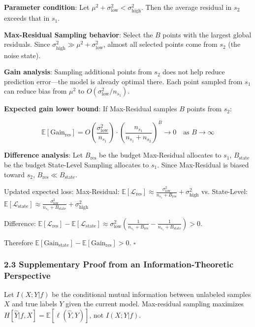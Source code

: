 \documentclass[
  12pt,
]{article}
\begin{document}
\textbf{Parameter condition}: Let
\(\mu^2 + \sigma^2_{\text{low}} < \sigma^2_{\text{high}}\). Then the average residual in \(s_2\)
exceeds that in \(s_1\).

\textbf{Max-Residual Sampling behavior}: Select the \(B\) points with the largest global residuals. Since
\(\sigma^2_{\text{high}} \gg \mu^2 + \sigma^2_{\text{low}}\), almost all selected points come from
\(s_2\) (the noise state).

\textbf{Gain analysis}: Sampling additional points from \(s_2\)
does not help reduce prediction error---the model is already optimal there. Each point sampled from \(s_1\)
can reduce bias from \(\mu^2\) to
\(O(\sigma^2_{\text{low}} / n_{s_1})\).

\textbf{Expected gain lower bound}: If Max-Residual samples \(B\) points from \(s_2\):

\[\mathbb{E}[\text{Gain}_{\text{res}}] = O\left(\frac{\sigma^2_{\text{low}}}{n_{s_1}}\right) \cdot \left(\frac{n_{s_1}}{n_{s_1} + n_{s_2}}\right)^B \to 0 \quad \text{as } B \to \infty\]

\textbf{Difference analysis}: Let \(B_{\text{res}}\) be the budget Max-Residual allocates to \(s_1\),
\(B_{\text{state}}\) be the budget State-Level Sampling allocates to \(s_1\). Since Max-Residual is biased toward
\(s_2\), \(B_{\text{res}} \ll B_{\text{state}}\).

Updated expected loss: Max-Residual:
\(\mathbb{E}[\mathcal{L}_{\text{res}}] \approx \frac{\sigma^2_{\text{low}}}{n_{s_1} + B_{\text{res}}} + \sigma^2_{\text{high}}\)
vs. State-Level:
\(\mathbb{E}[\mathcal{L}_{\text{state}}] \approx \frac{\sigma^2_{\text{low}}}{n_{s_1} + B_{\text{state}}} + \sigma^2_{\text{high}}\)

Difference: \(\mathbb{E}[\mathcal{L}_{\text{res}}] - \mathbb{E}[\mathcal{L}_{\text{state}}] \approx \sigma^2_{\text{low}}\left(\frac{1}{n_{s_1} + B_{\text{res}}} - \frac{1}{n_{s_1} + B_{\text{state}}}\right) > 0\).

Therefore
\(\mathbb{E}[\text{Gain}_{\text{state}}] - \mathbb{E}[\text{Gain}_{\text{res}}] > 0\). \(\square\)

\subsubsection{2.3
Supplementary Proof from an Information-Theoretic Perspective}\label{supplementary-proof-information-theoretic}

Let \(I(X; Y | f)\) be the conditional mutual information between unlabeled samples \(X\) and true labels \(Y\)
given the current model. Max-residual sampling maximizes
\(H[\hat{Y} | f, X] = \mathbb{E}[\ell(\hat{Y}, Y)]\), not
\(I(X; Y|f)\).
\end{document}
